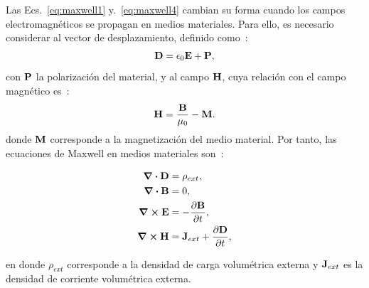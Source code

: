 Las Ecs.~\eqref{eq:maxwell1} y.~\eqref{eq:maxwell4} cambian su forma cuando los campos electromagnéticos se propagan en medios materiales. Para ello, es necesario considerar al vector de desplazamiento, definido como~\cite{Jackson}:
\begin{equation}
\vb{D} = \epsilon_{0} \vb{E} + \vb{P},
\label{eq:vecDes}
\end{equation}
con $\vb{P}$ la polarización del material, y al campo $\vb{H}$, cuya relación con el campo magnético es~\cite{Griffiths}:
\begin{equation}
\vb{H} = \frac{\vb{B}}{\mu_{0}}-\vb{M}.
\label{eq:campoH}
\end{equation}
donde $\vb{M}$ corresponde a la magnetización del medio material. Por tanto, las ecuaciones de Maxwell en medios materiales son~\cite{Jackson}:
\begin{tcolorbox}[title = Ecuaciones de Maxwell en medios materiales]\vspace*{-0.3cm}
\begin{subequations}
	\begin{align}
		\div \vb{D}& = \rho_{ext},\label{eq:maxwell1_mat}\\
		\div \vb{B}& =0,\\
		\curl \vb{E}& = - \pdv{\vb{B}}{t},\\
		\curl \vb{H} &= \vb{J}_{ext} + \pdv{\vb{D}}{t},
		\label{eq:maxwell4_mat}
	\end{align}
\end{subequations}
\end{tcolorbox}
\noindent en donde $\rho_{ext}$ corresponde a la densidad de carga volumétrica externa y $\vb{J}_{ext}$ es la densidad de corriente volumétrica externa. 

